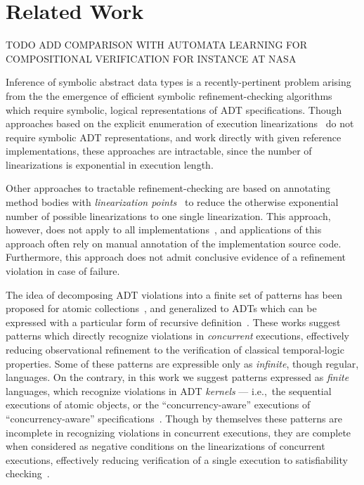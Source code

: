 \section{Related Work}
\label{sec:related}

TODO ADD COMPARISON WITH AUTOMATA LEARNING FOR COMPOSITIONAL VERIFICATION FOR
INSTANCE AT NASA

Inference of symbolic abstract data types is a recently-pertinent problem
arising from the the emergence of efficient symbolic refinement-checking
algorithms~\cite{conf/popl/BouajjaniEEH15, conf/pldi/EmmiEH15} which require
symbolic, logical representations of ADT specifications. Though approaches
based on the explicit enumeration of execution
linearizations~\cite{journals/jpdc/WingG93, conf/pldi/BurckhardtDMT10,
conf/asplos/BurnimNS11, conf/kbse/ZhangCW13} do not require symbolic ADT
representations, and work directly with given reference implementations, these
approaches are intractable, since the number of linearizations is exponential
in execution length.

Other approaches to tractable refinement-checking are based on annotating
method bodies with \emph{linearization
points}~\cite{journals/toplas/HerlihyW90, conf/cav/AmitRRSY07,
conf/fm/LiuCLS09, conf/cav/Vafeiadis10, conf/podc/OHearnRVYY10,
conf/icse/Zhang11a, conf/oopsla/ShachamBASVY11, conf/cav/DragoiGH13,
conf/pldi/LiangF13} to reduce the otherwise exponential number of possible
linearizations to one single linearization. This approach, however, does not
apply to all implementations~\cite{journals/toplas/HerlihyW90}, and
applications of this approach often rely on manual annotation of the
implementation source code. Furthermore, this approach does not admit
conclusive evidence of a refinement violation in case of failure.

The idea of decomposing ADT violations into a finite set of patterns has been
proposed for atomic collections~\cite{conf/tacas/AbdullaHHJR13,
conf/concur/HenzingerSV13, conf/popl/DoddsHK15, conf/popl/BouajjaniEEH15}, and
generalized to ADTs which can be expressed with a particular form of recursive
definition~\cite{journals/arxiv/BouajjaniEEH15}. These works suggest patterns
which directly recognize violations in \emph{concurrent} executions,
effectively reducing observational refinement to the verification of classical
temporal-logic properties. Some of these patterns are expressible only as
\emph{infinite}, though regular, languages. On the contrary, in this work we
suggest patterns expressed as \emph{finite} languages, which recognize
violations in ADT \emph{kernels} — i.e.,~the sequential executions of atomic
objects, or the “concurrency-aware” executions of “concurrency-aware”
specifications~\cite{conf/podc/HemedR14}. Though by themselves these patterns
are incomplete in recognizing violations in concurrent executions, they are
complete when considered as negative conditions on the linearizations of
concurrent executions, effectively reducing verification of a single execution
to satisfiability checking~\cite{conf/pldi/EmmiEH15}.
